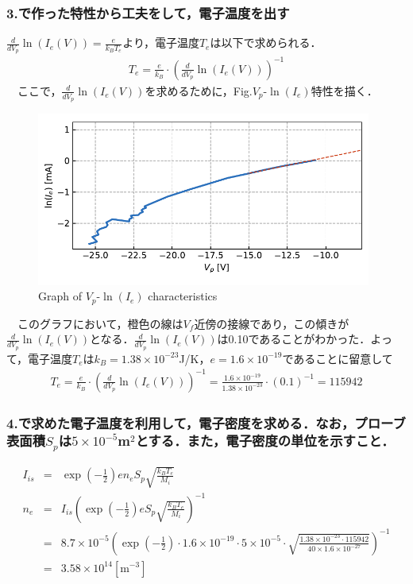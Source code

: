 \subsubsection{3.で作った特性から工夫をして，電子温度を出す}
$\frac{d}{dV_p} \ln\left(I_e(V)\right) = \frac{e}{k_B T_e}$より，電子温度$T_e$は以下で求められる．
\begin{eqnarray}
    T_e = \frac{e}{k_B}\cdot\left(\frac{d}{dV_p} \ln\left(I_e(V)\right)\right)^{-1}
\end{eqnarray}
　ここで，$\frac{d}{dV_p} \ln\left(I_e(V)\right)$を求めるために，Fig.$V_p$-$\ln(I_e)$特性を描く．
\begin{figure}[H]
    \centering
    \includegraphics[width=11cm]{./fig/3_4.pdf}
    \caption{Graph of $V_p$-$\ln(I_e)$ characteristics}
    \label{fig:Vp-lnIe}
\end{figure}
　このグラフにおいて，橙色の線は$V_f$近傍の接線であり，この傾きが$\frac{d}{dV_p} \ln\left(I_e(V)\right)$となる．$\frac{d}{dV_p} \ln\left(I_e(V)\right)$は0.10であることがわかった．よって，電子温度$T_e$は$k_B=1.38\times10^{-23}$J/K，$e=1.6\times10^{-19}$であることに留意して
\begin{eqnarray}
    T_e = \frac{e}{k_B}\cdot\left(\frac{d}{dV_p} \ln\left(I_e(V)\right)\right)^{-1} = \frac{1.6\times10^{-19}}{1.38\times10^{-23}}\cdot(0.1)^{-1} = 115942
\end{eqnarray}


\subsubsection{4.で求めた電子温度を利用して，電子密度を求める．なお，プローブ表面積$S_p$は$5 \times 10^{-5}$m$^2$とする．また，電子密度の単位を示すこと．}
\begin{eqnarray}
    I_{is} &=& \exp\left(-\frac{1}{2}\right)en_eS_p\sqrt{\frac{k_BT_e}{M_i}}\nonumber\\
    n_e &=& I_{is}\left(\exp\left(-\frac{1}{2}\right)eS_p\sqrt{\frac{k_BT_e}{M_i}}\right)^{-1}\nonumber\\
    &=& 8.7\times10^{-5}\left(\exp\left(-\frac{1}{2}\right)\cdot 1.6\times10^{-19} \cdot 5 \times 10^{-5} \cdot \sqrt{\frac{1.38\times10^{-23}\cdot115942}{40\times1.6\times10^{-27}}}\right)^{-1}\nonumber\\
    &=&3.58\times10^{14}[\mbox{m}^{-3}]
\end{eqnarray}

